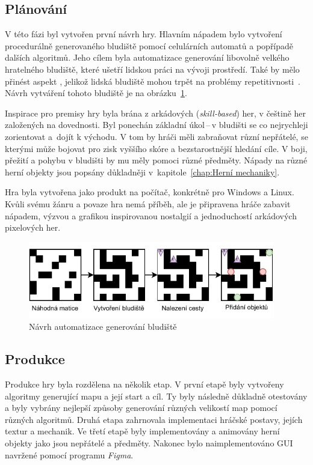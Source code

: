 \subsection*{Plánování}
V této fázi byl vytvořen první návrh hry. Hlavním nápadem bylo vytvoření procedurálně generovaného bludiště pomocí celulárních automatů a popřípadě dalších algoritmů. Jeho cílem byla automatizace generování libovolně velkého hratelného bludiště, které ušetří lidskou práci na vývoji prostředí. Také by mělo přinést aspekt , jelikož lidská bludiště mohou trpět na problémy repetitivnosti~\cite{Procedural_Game_Map}. Návrh vytváření tohoto bludiště je na obrázku~\ref{fig:navrh_generovani}.

Inspirace pro premisy hry byla brána z arkádových (\textit{skill-based}) her, v češtině her založených na dovednosti. Byl ponechán základní úkol\,--\,v bludišti se co nejrychleji zorientovat a~dojít k východu. V tom by hráči měli zabraňovat různí nepřátelé, se kterými může bojovat pro zisk vyššího skóre a bezstarostnější hledání cíle. V boji, přežití a pohybu v bludišti by mu měly pomoci různé předměty. Nápady na různé herní objekty jsou popsány důkladněji v~kapitole~\ref{chap:Herní mechaniky}.

Hra byla vytvořena jako produkt na počítač, konkrétně pro Windows a Linux. Kvůli svému žánru a povaze hra nemá příběh, ale je připravena hráče zabavit nápadem, výzvou a grafikou inspirovanou nostalgií a jednoduchostí arkádových pixelových her.

\begin{figure}[t]
    \centering
    \includegraphics[width=0.96\textwidth]{obrazky-figures/ch3/navrh_generovani.pdf}
    \caption{Návrh automatizace generování bludiště}
    \label{fig:navrh_generovani}
\end{figure}

\subsection*{Produkce}
Produkce hry byla rozdělena na několik etap. V první etapě byly vytvořeny algoritmy generující mapu a její start a cíl. Ty byly následně důkladně otestovány a byly vybrány nejlepší způsoby generování různých velikostí map pomocí různých algoritmů. Druhá etapa zahrnovala implementaci hráčské postavy, jejích textur a mechanik. Ve třetí etapě byly implementovány a animovány herní objekty jako jsou nepřátelé a předměty. Nakonec bylo naimplementováno GUI navržené pomocí programu \textit{Figma}.

